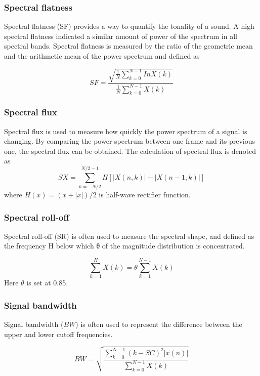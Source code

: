 \subsubsection{Spectral flatness}

Spectral flatness (SF) provides a way to quantify the tonality of a sound. A high spectral flatness indicated a similar amount of power of the spectrum in all spectral bands. Spectral flatness is measured by the ratio of the geometric mean and the arithmetic mean of the power spectrum and defined as

\begin{equation}
SF = \frac{\sqrt{\frac{1}{N}\sum_{k=0}^{N-1}InX(k)}}{\frac{1}{N}\sum_{k=0}^{N-1}{X(k)}}
\end{equation}


\subsubsection{Spectral flux}


Spectral flux is used to measure how quickly the power spectrum of a signal is changing. By comparing the power spectrum between one frame and its previous one, the spectral flux can be obtained. The calculation of spectral flux is denoted as 
\begin{equation}
SX = \sum_{k=-N/2}^{N/2-1} H[|X(n,k)| - |X(n-1,k)|]
\end{equation}
where $H(x)=(x+|x|)/2$ is half-wave rectifier function.



\subsubsection{Spectral roll-off}
Spectral roll-off (SR) is often used to measure the spectral shape, and defined as the frequency H below which θ of the magnitude distribution is concentrated. 

\begin{equation}
\sum_{k=1}^{H}X(k) = \theta \sum_{k=1}^{N-1}X(k)
\end{equation}
Here $\theta$ is set at 0.85.


\subsubsection{Signal bandwidth}
Signal bandwidth ($BW$) is often used to represent the difference between the upper and lower cutoff frequencies. 

\begin{equation}
BW = \sqrt{\frac{\sum_{k=0}^{N-1}(k-SC)^{2}|x(n)|}{\sum_{k = 0}^{N-1}X(k)}}
\end{equation}



